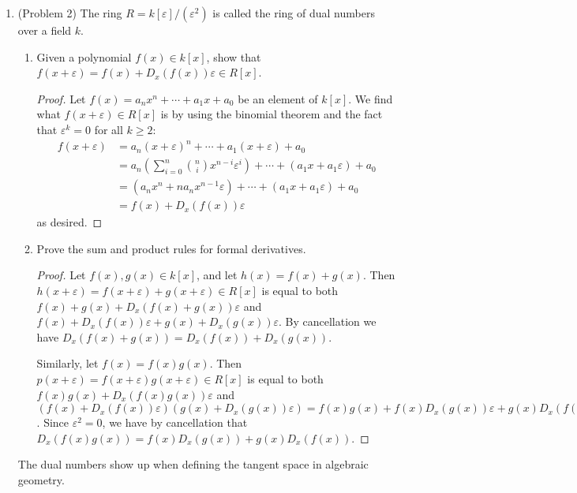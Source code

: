 \documentclass[11pt]{article}
\begin{document}
\begin{enumerate}
\begin{proof}
        Then when $p$ is odd and $n = 1$, we have $-1 = \prod_{\alpha\in \mathbb{F}^\times_{p}}\alpha = (p-1)!$, which is Wilson's theorem.
    \end{proof}
    \item (Problem 2) The ring $R = k[\varepsilon]/(\varepsilon^2)$ is called the ring of dual numbers over a field $k$. \begin{enumerate}
        \item Given a polynomial $f(x)\in k[x]$, show that $f(x+\varepsilon) = f(x) + D_x(f(x))\varepsilon \in R[x]$. \begin{proof}
            Let $f(x) = a_nx^n + \cdots + a_1x + a_0$ be an element of $k[x]$. We find what $f(x+\varepsilon)\in R[x]$ is by using the binomial theorem and the fact that $\varepsilon^k = 0$ for all $k\geq 2$: \begin{align*}
                f(x+\varepsilon) &= a_n(x+\varepsilon)^n + \cdots + a_1(x+\varepsilon) + a_0 \\
                &= a_n\left(\sum_{i=0}^n \binom{n}{i}x^{n-i}\varepsilon^i \right) + \cdots + (a_1x + a_1\varepsilon) + a_0\\
                &= (a_nx^n + na_nx^{n-1}\varepsilon) + \cdots + (a_1x + a_1\varepsilon) + a_0\\
                &= f(x) + D_x(f(x))\varepsilon
            \end{align*} as desired.
        \end{proof}
        \item Prove the sum and product rules for formal derivatives. \begin{proof}
            Let $f(x),g(x)\in k[x]$, and let $h(x) = f(x) + g(x)$. Then $h(x+\varepsilon) = f(x+\varepsilon) + g(x+\varepsilon)\in R[x]$ is equal to both $f(x) + g(x) + D_x(f(x) + g(x))\varepsilon$ and $f(x) + D_x(f(x))\varepsilon + g(x) + D_x(g(x))\varepsilon$. By cancellation we have $D_x(f(x) + g(x)) = D_x(f(x)) + D_x(g(x))$.

            Similarly, let $f(x) = f(x)g(x)$. Then $p(x+\varepsilon) = f(x+\varepsilon)g(x+\varepsilon)\in R[x]$ is equal to both $f(x)g(x) + D_x(f(x)g(x))\varepsilon$ and $(f(x) + D_x(f(x))\varepsilon)(g(x) + D_x(g(x))\varepsilon) = f(x)g(x) + f(x)D_x(g(x))\varepsilon + g(x)D_x(f(x))\varepsilon + D_x(f(x))D_x(g(x))\varepsilon^2$. Since $\varepsilon^2 = 0$, we have by cancellation that $D_x(f(x)g(x)) = f(x)D_x(g(x)) + g(x)D_x(f(x))$.
        \end{proof}
    \end{enumerate} The dual numbers show up when defining the tangent space in algebraic geometry.
\end{enumerate}
\end{document}
